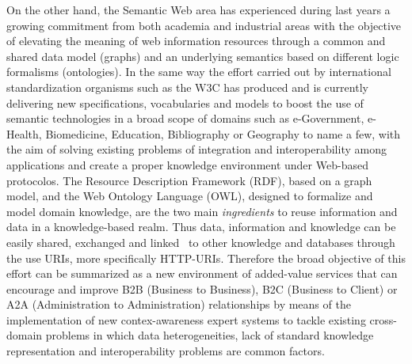 \documentclass{llncs}
\begin{document}
On the other hand, the Semantic Web area has experienced during last years a growing commitment from both academia and industrial areas 
with the objective of elevating the meaning of web information resources through a common and shared data model (graphs) and 
an underlying semantics based on different logic formalisms (ontologies). In the same way the 
effort carried out by international standardization organisms such as the W3C has produced and is currently delivering 
new specifications, vocabularies and models to boost the use of semantic technologies in a broad scope 
of domains such as e-Government, e-Health, Biomedicine, Education, Bibliography or Geography to name a few, 
with the aim of solving existing problems of integration and interoperability among applications and create 
a proper knowledge environment under Web-based protocolos. The Resource Description Framework (RDF), based on a graph model, 
and the Web Ontology Language (OWL), designed to formalize and model domain knowledge, are the two main \textit{ingredients} to reuse 
information and data in a knowledge-based realm. Thus data, information and knowledge can be easily shared, exchanged and linked~\cite{Maali_Cyganiak_2011} 
to other knowledge and databases through the use URIs, more specifically HTTP-URIs. Therefore the broad objective of this effort can 
be summarized as a new environment of added-value services that can encourage and improve B2B (Business to Business), B2C (Business to Client) or 
A2A (Administration to Administration) relationships by means of the implementation of new contex-awareness expert systems 
to tackle existing cross-domain problems in which data heterogeneities, lack of standard knowledge representation and 
interoperability problems are common factors. 
\end{document}
